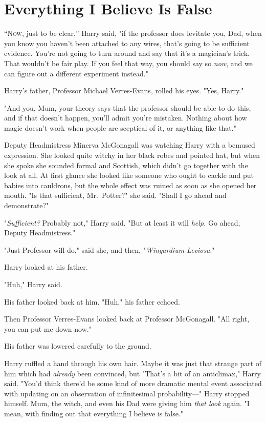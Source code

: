 \chapter{Everything I Believe Is False}

\lettrine{“N}{ow}, just to be clear,'' Harry said, "if the professor does levitate you, Dad,
when you know you haven't been attached to any wires, that's going to be
sufficient evidence. You're not going to turn around and say that it's a
magician's trick. That wouldn't be fair play. If you feel that way, you should
say so \emph{now}, and we can figure out a different experiment instead."

Harry's father, Professor Michael Verres-Evans, rolled his eyes. "Yes, Harry."

"And you, Mum, your theory says that the professor should be able to do this,
and if that doesn't happen, you'll admit you're mistaken. Nothing about how
magic doesn't work when people are sceptical of it, or anything like that."

Deputy Headmistress Minerva McGonagall was watching Harry with a bemused
expression. She looked quite witchy in her black robes and pointed hat, but
when she spoke she sounded formal and Scottish, which didn't go together with
the look at all. At first glance she looked like someone who ought to cackle
and put babies into cauldrons, but the whole effect was ruined as soon as she
opened her mouth. "Is that sufficient, Mr.~Potter?" she said. "Shall I go ahead
and demonstrate?"

"\emph{Sufficient?} Probably not," Harry said. "But at least it will
\emph{help.} Go ahead, Deputy Headmistress."

"Just Professor will do," said she, and then, "\emph{Wingardium Leviosa}."

Harry looked at his father.

"Huh," Harry said.

His father looked back at him. "Huh," his father echoed.

Then Professor Verres-Evans looked back at Professor McGonagall. "All right,
you can put me down now."

His father was lowered carefully to the ground.

Harry ruffled a hand through his own hair. Maybe it was just that strange part
of him which had \emph{already} been convinced, but{\el} "That's a bit of an
anticlimax," Harry said. "You'd think there'd be some kind of more dramatic
mental event associated with updating on an observation of infinitesimal
probability\mbox{---}" Harry stopped himself. Mum, the witch, and even his Dad were
giving him \emph{that look} again. "I mean, with finding out that everything I
believe is false."

